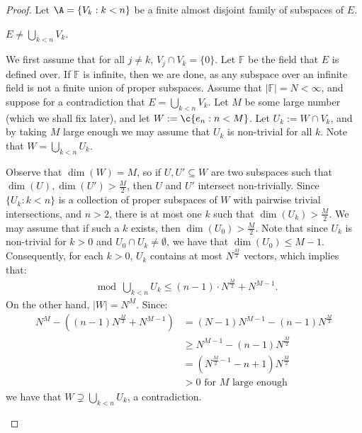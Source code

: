 \documentclass[11pt,reqno]{amsart}
\begin{document}
\begin{proof}
    Let $\A = \{V_k : k < n\}$ be a finite almost disjoint family of subspaces of $E$. 

    \begin{claim}
    \label{claim:E.not.union}
        $E \neq \bigcup_{k<n} V_k$.
    \end{claim}

    \begin{midproof}
        We first assume that for all $j \neq k$, $V_j \cap V_k = \{0\}$. Let $\mathbb{F}$ be the field that $E$ is defined over. If $\mathbb{F}$ is infinite, then we are done, as any subspace over an infinite field is not a finite union of proper subspaces. Assume that $|\mathbb{F}| = N < \infty$, and suppose for a contradiction that $E = \bigcup_{k<n} V_k$. Let $M$ be some large number (which we shall fix later), and let $W := \c{e_n : n < M}$. Let $U_k := W \cap V_k$, and by taking $M$ large enough we may assume that $U_k$ is non-trivial for all $k$. Note that $W = \bigcup_{k<n} U_k$.
        
        Observe that $\dim(W) = M$, so if $U,U' \subseteq W$ are two subspaces such that $\dim(U),\dim(U') > \frac{M}{2}$, then $U$ and $U'$ intersect non-trivially. Since $\{U_k : k < n\}$ is a collection of proper subspaces of $W$ with pairwise trivial intersections, and $n > 2$, there is at most one $k$ such that $\dim(U_k) > \frac{M}{2}$. We may assume that if such a $k$ exists, then $\dim(U_0) > \frac{M}{2}$. Note that since $U_k$ is non-trivial for $k > 0$ and $U_0 \cap U_k \neq \emptyset$, we have that $\dim(U_0) \leq M - 1$. Consequently, for each $k > 0$, $U_k$ contains at most $N^{\frac{M}{2}}$ vectors, which implies that:
        \begin{align*}
            \mod{\bigcup_{k<n} U_k} \leq (n -1) \cdot N^{\frac{M}{2}} + N^{M-1}.
        \end{align*}
        On the other hand, $|W| = N^M$. Since:
        \begin{align*}
            N^M - ((n - 1)N^{\frac{M}{2}} + N^{M-1}) &= (N - 1)N^{M-1} - (n - 1)N^{\frac{M}{2}} \\
            &\geq N^{M-1} - (n-1)N^\frac{M}{2} \\
            &= (N^{\frac{M}{2} - 1} - n + 1)N^\frac{M}{2} \\
            &> 0 \text{ for $M$ large enough}
        \end{align*}
        we have that $W \supsetneq \bigcup_{k<n} U_k$, a contradiction.


\end{midproof}
\end{proof}
\end{document}
